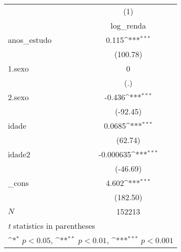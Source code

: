 {
\def\sym#1{\ifmmode^{#1}\else\(^{#1}\)\fi}
\begin{tabular}{l*{1}{c}}
\hline\hline
            &\multicolumn{1}{c}{(1)}\\
            &\multicolumn{1}{c}{log\_renda}\\
\hline
anos\_estudo &       0.115\sym{***}\\
            &    (100.78)         \\
[1em]
1.sexo      &           0         \\
            &         (.)         \\
[1em]
2.sexo      &      -0.436\sym{***}\\
            &    (-92.45)         \\
[1em]
idade       &      0.0685\sym{***}\\
            &     (62.74)         \\
[1em]
idade2      &   -0.000635\sym{***}\\
            &    (-46.69)         \\
[1em]
\_cons      &       4.602\sym{***}\\
            &    (182.50)         \\
\hline
\(N\)       &      152213         \\
\hline\hline
\multicolumn{2}{l}{\footnotesize \textit{t} statistics in parentheses}\\
\multicolumn{2}{l}{\footnotesize \sym{*} \(p<0.05\), \sym{**} \(p<0.01\), \sym{***} \(p<0.001\)}\\
\end{tabular}
}
